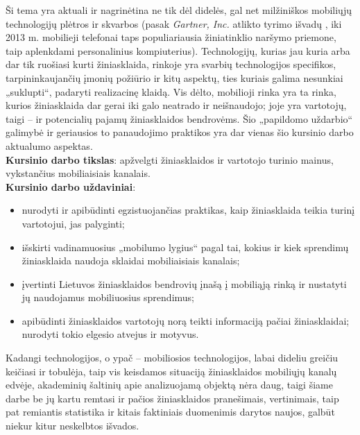 \documentclass[kursinis-darbas]{vukf}
\begin{document}
Ši tema yra aktuali ir nagrinėtina ne tik dėl didelės, gal net milžiniškos mobiliųjų technologijų plėtros ir skvarbos (pasak \emph{Gartner, Inc.} atlikto tyrimo išvadų \cite{gartner_highlights_key_predictions_for_it_organisations_and_users_in_2010_and_beyond}, iki 2013 m. mobilieji telefonai taps populiariausia žiniatinklio naršymo priemone, taip aplenkdami personalinius kompiuterius). Technologijų, kurias jau kuria arba dar tik ruošiasi kurti žiniasklaida, rinkoje yra svarbių technologijos specifikos, tarpininkaujančių įmonių požiūrio ir kitų aspektų, ties kuriais galima nesunkiai „suklupti“, padaryti realizacinę klaidą. Vis dėlto, mobilioji rinka yra ta rinka, kurios žiniasklaida dar gerai iki galo neatrado ir neišnaudojo; joje yra vartotojų, taigi – ir potencialių pajamų žiniasklaidos bendrovėms. Šio „papildomo uždarbio“ galimybė ir geriausios to panaudojimo praktikos yra dar vienas šio kursinio darbo aktualumo aspektas.\\

\textbf{Kursinio darbo tikslas}: apžvelgti žiniasklaidos ir vartotojo turinio mainus, vykstančius mobiliaisiais kanalais.\\

\textbf{Kursinio darbo uždaviniai}:

\begin{itemize}
	\item nurodyti ir apibūdinti egzistuojančias praktikas, kaip žiniasklaida teikia turinį vartotojui, jas palyginti;
	\item išskirti vadinamuosius „mobilumo lygius“ pagal tai, kokius ir kiek sprendimų žiniasklaida naudoja sklaidai mobiliaisiais kanalais;
	\item įvertinti Lietuvos žiniasklaidos bendrovių įnašą į mobiliąją rinką ir nustatyti jų naudojamus mobiliuosius sprendimus;
	\item apibūdinti žiniasklaidos vartotojų norą teikti informaciją pačiai žiniasklaidai; nurodyti tokio elgesio atvejus ir motyvus.
\end{itemize}

Kadangi technologijos, o ypač – mobiliosios technologijos, labai dideliu greičiu keičiasi ir tobulėja, taip vis keisdamos situaciją žiniasklaidos mobiliųjų kanalų edvėje, akademinių šaltinių apie analizuojamą objektą nėra daug, taigi šiame darbe be jų kartu remtasi ir pačios žiniasklaidos pranešimais, vertinimais, taip pat remiantis statistika ir kitais faktiniais duomenimis darytos naujos, galbūt niekur kitur neskelbtos išvados.
\end{document}
